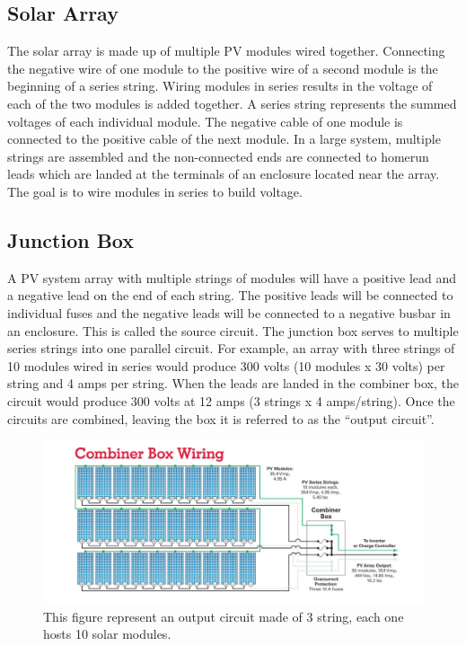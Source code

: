 \subsection{Solar Array}
The solar array is made up of multiple PV modules wired
together. Connecting the negative wire of one module to
the positive wire of a second module is the beginning of a
series string. Wiring modules in series results in the voltage of
each of the two modules is added together. A series string represents the summed voltages of each
individual module. The negative cable of one module is connected
to the positive cable of the next module. In a large system,
multiple strings are assembled and the non-connected ends are
connected to homerun leads which are landed at the terminals
of an enclosure located near the array.
The goal is to wire modules in series to build voltage.

\subsection{Junction Box}
A PV system array with multiple strings of modules will
have a positive lead and a negative lead on the end of each
string. The positive leads will be connected to individual
fuses and the negative leads will be connected to a negative
busbar in an enclosure. This is called the source circuit. The
junction box serves to  multiple series strings into
one parallel circuit. For example, an array with three strings
of 10 modules wired in series would produce 300 volts (10
modules x 30 volts) per string and 4 amps per string. When
the leads are landed in the combiner box, the circuit would
produce 300 volts at 12 amps (3 strings x 4 amps/string). Once
the circuits are combined, leaving the box it is referred to as
the “output circuit”.

\begin{figure}[H]
	\centering
	\includegraphics[width=\textwidth, keepaspectratio]{chapters/1_introduction/imgs/junctionbox.png}
	\caption{This figure represent an output circuit made of 3 string, each one hosts 10 solar modules.}
	\label{fig:outcircuit}
\end{figure}

